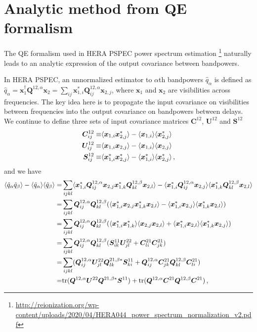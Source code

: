\documentclass[12pt,a4paper]{article}
\begin{document}
\section{Analytic method from QE formalism}
\label{ap:analytic}
The QE formalism used in HERA PSPEC power spectrum estimation \footnote{\url{http://reionization.org/wp-content/uploads/2020/04/HERA044_power_spectrum_normalization_v2.pdf}} naturally leads to an analytic expression of the output covariance between bandpowers.

In HERA PSPEC, an unnormalized estimator to $\alpha$th bandpowers $\hat{q}_\alpha$ is defined as $\hat{q}_\alpha = \bm{x}_1^\dagger \bm{Q}^{12,\alpha} \bm{x}_2 = \sum_{ij} \bm{x}_{1,i}^*\bm{Q}^{12,\alpha}_{ij}\bm{x}_{2,j}$, where $\bm{x}_{1}$ and $\bm{x}_{2}$ are visibilities across frequencies. The key idea here is to propagate the input covariance on visibilities between frequencies into the output covariance on bandpowers between delays. We continue to define three sets of input covariance matrices $\bm{C}^{12}$, $\bm{U}^{12}$ and $\bm{S}^{12}$
\begin{align}
\bm{C}^{12}_{ij} \equiv & \langle \bm{x}_{1,i} \bm{x}_{2,j}^* \rangle - \langle \bm{x}_{1,i} \rangle \langle \bm{x}_{2,j}^*\rangle \notag\\
\bm{U}^{12}_{ij} \equiv & \langle \bm{x}_{1,i} \bm{x}_{2,j}\rangle - \langle \bm{x}_{1,i}\rangle\langle \bm{x}_{2,j}\rangle \notag \\
\bm{S}^{12}_{ij} \equiv & \langle \bm{x}_{1,i}^* \bm{x}_{2,j}^*\rangle - \langle \bm{x}_{1,i}^*\rangle \langle \bm{x}_{2,j}^*\rangle \,,
\end{align}
and we have
\begin{align}
\langle \hat{q}_\alpha \hat{q}_\beta \rangle - \langle \hat{q}_\alpha \rangle\langle \hat{q}_\beta\rangle =&
\sum_{ijkl}\langle \bm{x}_{1,i}^*\bm{Q}^{12,\alpha}_{ij}\bm{x}_{2,j}\bm{x}_{1,k}^*\bm{Q}^{12,\beta}_{kl}\bm{x}_{2,l}\rangle - \langle \bm{x}_{1,i}^*\bm{Q}^{12,\alpha}_{ij}\bm{x}_{2,j}\rangle\langle \bm{x}_{1,k}^*\bm{Q}^{12,\beta}_{kl}\bm{x}_{2,l}\rangle\notag\\
=&\sum_{ijkl}\bm{Q}^{12,\alpha}_{ij}\bm{Q}^{12,\beta}_{kl}(\langle \bm{x}_{1,i}^*\bm{x}_{2,j}\bm{x}_{1,k}^*\bm{x}_{2,l}\rangle - \langle \bm{x}_{1,i}^*\bm{x}_{2,j}\rangle\langle \bm{x}_{1,k}^*\bm{x}_{2,l}\rangle)\notag\\
=&\sum_{ijkl}\bm{Q}^{12,\alpha}_{ij}\bm{Q}^{12,\beta}_{kl}(\langle \bm{x}_{1,i}^*\bm{x}_{1,k}^*\rangle\langle \bm{x}_{2,j}\bm{x}_{2,l}\rangle + \langle \bm{x}_{1,i}^*\bm{x}_{2,l}\rangle \langle \bm{x}_{1,k}^*\bm{x}_{2,j}\rangle)\notag\\
=&\sum_{ijkl}\bm{Q}^{12,\alpha}_{ij}\bm{Q}^{12,\beta}_{kl} (\bm{S}_{ik}^{11}\bm{U}_{jl}^{22} + \bm{C}^{21}_{li}\bm{C}^{21}_{jk})\notag\\
=&\sum_{ijkl}( \bm{Q}^{12,\alpha}_{ij}\bm{U}_{jl}^{22}\bm{Q}^{21,\beta*}_{lk} \bm{S}_{ki}^{11} + \bm{Q}^{12,\alpha}_{ij}\bm{C}^{21}_{jk} \bm{Q}^{12,\beta}_{kl} \bm{C}^{21}_{li} ) \notag\\
=&\text{tr}(\bm{Q}^{12,\alpha} \bm{U}^{22} \bm{Q}^{21,\beta*} \bm{S}^{11}) + \text{tr}(\bm{Q}^{12,\alpha} \bm{C}^{21} \bm{Q}^{12,\beta} \bm{C}^{21}) \,,
\end{align}
\end{document}
